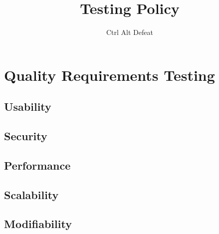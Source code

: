 \documentclass[12pt]{article}
\title{Testing Policy}
\author{Ctrl Alt Defeat}
\begin{document}

\tableofcontents
\newpage

\newpage
\section{Quality Requirements Testing}
\subsection{Usability}
\subsection{Security}
\subsection{Performance}
\subsection{Scalability}
\subsection{Modifiability}

\newpage
\end{document}
